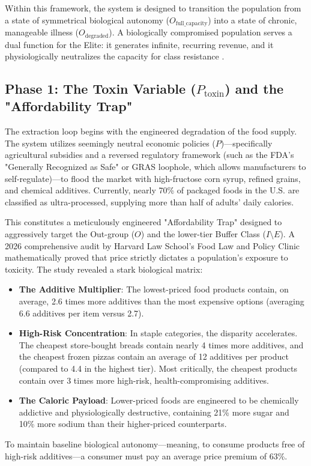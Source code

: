 Within this framework, the system is designed to transition the population from a state of symmetrical biological autonomy ($O_{\text{full\_capacity}}$) into a state of chronic, manageable illness ($O_{\text{degraded}}$). A biologically compromised population serves a dual function for the Elite: it generates infinite, recurring revenue, and it physiologically neutralizes the capacity for class resistance \cite{washington}.

\subsection{Phase 1: The Toxin Variable (\texorpdfstring{$P_{\text{toxin}}$}{P\_toxin}) and the "Affordability Trap"}

The extraction loop begins with the engineered degradation of the food supply. The system utilizes seemingly neutral economic policies ($P$)—specifically agricultural subsidies and a reversed regulatory framework (such as the FDA's "Generally Recognized as Safe" or GRAS loophole, which allows manufacturers to self-regulate)—to flood the market with high-fructose corn syrup, refined grains, and chemical additives. Currently, nearly 70\% of packaged foods in the U.S. are classified as ultra-processed, supplying more than half of adults' daily calories.

This constitutes a meticulously engineered "Affordability Trap" designed to aggressively target the Out-group ($O$) and the lower-tier Buffer Class ($I \setminus E$). A 2026 comprehensive audit by Harvard Law School’s Food Law and Policy Clinic mathematically proved that price strictly dictates a population's exposure to toxicity.
The study revealed a stark biological matrix:
\begin{itemize}
    \item \textbf{The Additive Multiplier}: The lowest-priced food products contain, on average, 2.6 times more additives than the most expensive options (averaging 6.6 additives per item versus 2.7).
    \item \textbf{High-Risk Concentration}: In staple categories, the disparity accelerates. The cheapest store-bought breads contain nearly 4 times more additives, and the cheapest frozen pizzas contain an average of 12 additives per product (compared to 4.4 in the highest tier). Most critically, the cheapest products contain over 3 times more high-risk, health-compromising additives.
    \item \textbf{The Caloric Payload}: Lower-priced foods are engineered to be chemically addictive and physiologically destructive, containing 21\% more sugar and 10\% more sodium than their higher-priced counterparts.
\end{itemize}
To maintain baseline biological autonomy—meaning, to consume products free of high-risk additives—a consumer must pay an average price premium of 63\%.


